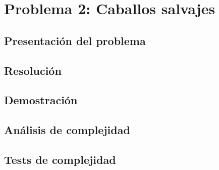 \section{Problema 2: Caballos salvajes}

\subsection{Presentación del problema}

\subsection{Resolución}

\subsection{Demostración}

\subsection{Análisis de complejidad}

\subsection{Tests de complejidad}
